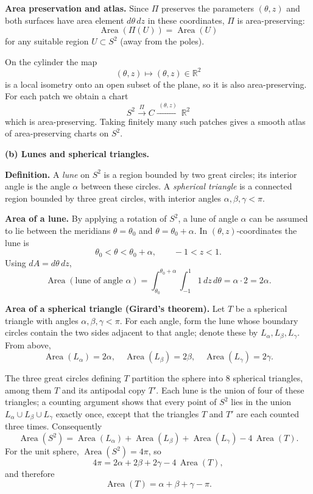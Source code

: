 \documentclass[12pt,a4paper]{article}
\theoremstyle{plain}
\theoremstyle{definition}      %
\begin{document}
\medskip
\textbf{Area preservation and atlas.}
Since $\Pi$ preserves the parameters $(\theta,z)$ and both surfaces
have area element $d\theta\,dz$ in these coordinates, $\Pi$ is
area-preserving:
\[
\operatorname{Area}(\Pi(U)) = \operatorname{Area}(U)
\]
for any suitable region $U\subset S^{2}$ (away from the poles).

On the cylinder the map
\[
(\theta,z)\mapsto (\theta,z)\in\mathbb{R}^{2}
\]
is a local isometry onto an open subset of the plane, so it is also
area-preserving. For each patch we obtain a chart
\[
S^{2}\xrightarrow{\;\Pi\;}C\xrightarrow{\;(\theta,z)\;}\mathbb{R}^{2}
\]
which is area-preserving. Taking finitely many such patches gives a
smooth atlas of area-preserving charts on $S^{2}$.

\bigskip
\textbf{(b) Lunes and spherical triangles.}

\textbf{Definition.}
A \emph{lune} on $S^{2}$ is a region bounded by two great circles; its
interior angle is the angle $\alpha$ between these circles. A
\emph{spherical triangle} is a connected region bounded by three great
circles, with interior angles $\alpha,\beta,\gamma<\pi$.

\medskip
\textbf{Area of a lune.}
By applying a rotation of $S^{2}$, a lune of angle $\alpha$ can be
assumed to lie between the meridians $\theta=\theta_{0}$ and
$\theta=\theta_{0}+\alpha$. In $(\theta,z)$-coordinates the lune is
\[
\theta_0<\theta<\theta_0+\alpha,\qquad -1<z<1.
\]
Using $dA = d\theta\,dz$,
\[
\operatorname{Area}(\text{lune of angle }\alpha)
= \int_{\theta_0}^{\theta_0+\alpha}\int_{-1}^{1} 1\,dz\,d\theta
= \alpha\cdot 2 = 2\alpha.
\]

\medskip
\textbf{Area of a spherical triangle (Girard's theorem).}
Let $T$ be a spherical triangle with angles $\alpha,\beta,\gamma<\pi$.
For each angle, form the lune whose boundary circles contain the two
sides adjacent to that angle; denote these by $L_\alpha,L_\beta,L_\gamma$.
From above,
\[
\operatorname{Area}(L_\alpha)=2\alpha,\quad
\operatorname{Area}(L_\beta)=2\beta,\quad
\operatorname{Area}(L_\gamma)=2\gamma.
\]

The three great circles defining $T$ partition the sphere into $8$
spherical triangles, among them $T$ and its antipodal copy $T'$.
Each lune is the union of four of these triangles; a counting argument
shows that every point of $S^{2}$ lies in the union
$L_\alpha\cup L_\beta\cup L_\gamma$ exactly once, except that the
triangles $T$ and $T'$ are each counted three times. Consequently
\[
\operatorname{Area}(S^{2})
= \operatorname{Area}(L_\alpha)
+\operatorname{Area}(L_\beta)
+\operatorname{Area}(L_\gamma)
- 4\,\operatorname{Area}(T).
\]
For the unit sphere, $\operatorname{Area}(S^{2})=4\pi$, so
\[
4\pi = 2\alpha+2\beta+2\gamma -4\,\operatorname{Area}(T),
\]
and therefore
\[
\operatorname{Area}(T) = \alpha+\beta+\gamma-\pi.
\]
\end{document}
